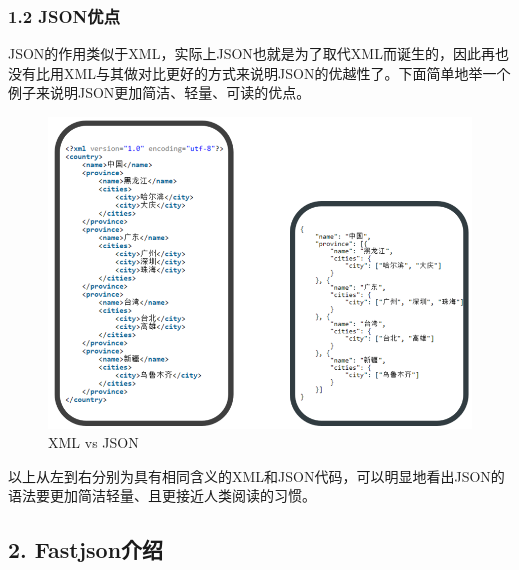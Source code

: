 \documentclass{article}
\begin{document}
\subsubsection*{1.2 JSON优点}
JSON的作用类似于XML，实际上JSON也就是为了取代XML而诞生的，因此再也没有比用XML与其做对比更好的方式来说明JSON的优越性了。下面简单地举一个例子来说明JSON更加简洁、轻量、可读的优点。
\begin{figure}[htb]
\centering %
\includegraphics[width = 17cm]{pic3.png}
\caption{XML vs JSON}
\end{figure}


以上从左到右分别为具有相同含义的XML和JSON代码，可以明显地看出JSON的语法要更加简洁轻量、且更接近人类阅读的习惯。


\subsection*{2. Fastjson介绍}
\end{document}
